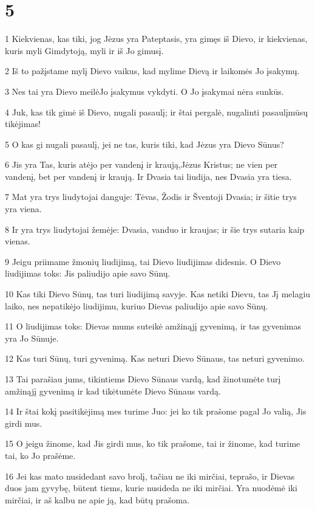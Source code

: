 \chapter{5}


\par 1 Kiekvienas, kas tiki, jog Jėzus yra Pateptasis, yra gimęs iš Dievo, ir kiekvienas, kuris myli Gimdytoją, myli ir iš Jo gimusį. 
\par 2 Iš to pažįstame mylį Dievo vaikus, kad mylime Dievą ir laikomės Jo įsakymų. 
\par 3 Nes tai yra Dievo meilė­Jo įsakymus vykdyti. O Jo įsakymai nėra sunkūs. 
\par 4 Juk, kas tik gimė iš Dievo, nugali pasaulį; ir štai pergalė, nugalinti pasaulį­mūsų tikėjimas! 
\par 5 O kas gi nugali pasaulį, jei ne tas, kuris tiki, kad Jėzus yra Dievo Sūnus? 
\par 6 Jis yra Tas, kuris atėjo per vandenį ir kraują,­Jėzus Kristus; ne vien per vandenį, bet per vandenį ir kraują. Ir Dvasia tai liudija, nes Dvasia yra tiesa. 
\par 7 Mat yra trys liudytojai danguje: Tėvas, Žodis ir Šventoji Dvasia; ir šitie trys yra viena. 
\par 8 Ir yra trys liudytojai žemėje: Dvasia, vanduo ir kraujas; ir šie trys sutaria kaip vienas. 
\par 9 Jeigu priimame žmonių liudijimą, tai Dievo liudijimas didesnis. O Dievo liudijimas toks: Jis paliudijo apie savo Sūnų. 
\par 10 Kas tiki Dievo Sūnų, tas turi liudijimą savyje. Kas netiki Dievu, tas Jį melagiu laiko, nes nepatikėjo liudijimu, kuriuo Dievas paliudijo apie savo Sūnų. 
\par 11 O liudijimas toks: Dievas mums suteikė amžinąjį gyvenimą, ir tas gyvenimas yra Jo Sūnuje. 
\par 12 Kas turi Sūnų, turi gyvenimą. Kas neturi Dievo Sūnaus, tas neturi gyvenimo. 
\par 13 Tai parašiau jums, tikintiems Dievo Sūnaus vardą, kad žinotumėte turį amžinąjį gyvenimą ir kad tikėtumėte Dievo Sūnaus vardą. 
\par 14 Ir štai kokį pasitikėjimą mes turime Juo: jei ko tik prašome pagal Jo valią, Jis girdi mus. 
\par 15 O jeigu žinome, kad Jis girdi mus, ko tik prašome, tai ir žinome, kad turime tai, ko Jo prašėme. 
\par 16 Jei kas mato nusidedant savo brolį, tačiau ne iki mirčiai, teprašo, ir Dievas duos jam gyvybę, būtent tiems, kurie nusideda ne iki mirčiai. Yra nuodėmė iki mirčiai, ir aš kalbu ne apie ją, kad būtų prašoma. 
